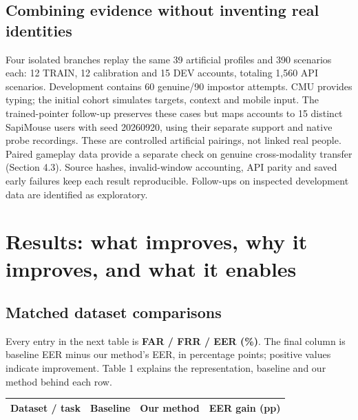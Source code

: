 \documentclass[10pt,a4paper]{article}
\newcommand{\smalltable}{\fontsize{8.5}{10.4}\selectfont}
\begin{document}
\subsection{Combining evidence without inventing real identities}
Four isolated branches replay the same 39 artificial profiles and 390 scenarios each: 12 TRAIN, 12 calibration and 15 DEV accounts, totaling 1,560 API scenarios. Development contains 60 genuine/90 impostor attempts. CMU provides typing; the initial cohort simulates targets, context and mobile input. The trained-pointer follow-up preserves these cases but maps accounts to 15 distinct SapiMouse users with seed 20260920, using their separate support and native probe recordings. These are controlled artificial pairings, not linked real people. Paired gameplay data provide a separate check on genuine cross-modality transfer (Section 4.3). Source hashes, invalid-window accounting, API parity and saved early failures keep each result reproducible. Follow-ups on inspected development data are identified as exploratory.

\newpage
\section{Results: what improves, why it improves, and what it enables}
\subsection{Matched dataset comparisons}
Every entry in the next table is \textbf{FAR / FRR / EER (\%)}. The final column is baseline EER minus our method's EER, in percentage points; positive values indicate improvement. Table 1 explains the representation, baseline and our method behind each row.
\begin{center}\smalltable
\begin{tabularx}{\linewidth}{@{}Xrrr@{}}
\toprule
\textbf{Dataset / task} & \textbf{Baseline} & \textbf{Our method} & \textbf{EER gain (pp)}\\\midrule

\end{tabularx}
\end{center}
\end{document}
